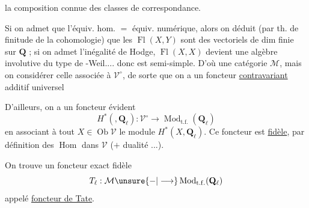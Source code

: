 la composition connue des classes de correspondance.

Si on admet que l'équiv. hom. $=$ équiv. numérique, alors on déduit (par th. de finitude de la cohomologie) que les $\operatorname{Fl}(X,Y)$ sont des  vectoriels de dim finie sur $\mathbf Q$ ; si on admet l'inégalité de Hodge,  $\operatorname{Fl}(X,X)$ devient une algèbre involutive du type de -Weil.... donc est semi-simple. D'où une catégorie  $\mathcal M$, mais on  considérer celle associée à $\mathcal V^\circ$, de sorte que on a un foncteur \uline{contravariant} additif universel

D'ailleurs, on a un foncteur évident
\[
H^{*}(,\mathbf Q_\ell):\mathcal V^\circ\longrightarrow\operatorname{Mod}_{\mathrm{t.f.}}(\mathbf Q_\ell)
\]
en associant à tout $X\in\operatorname{Ob}\mathcal V$ le module $H^{*}(X,\mathbf Q_\ell)$. Ce foncteur est \uline{fidèle}, par définition  des $\operatorname{Hom}$ dans $\mathcal V$ ($+$ dualité ...).

On trouve un foncteur exact fidèle 
\[
T_\ell:\mathcal M\unsure{\mathbin{-}|\longrightarrow}\operatorname{Mod}_{\mathrm{t.f.}}(\mathbf Q_\ell)
\]
appelé \uline{foncteur de Tate}.
